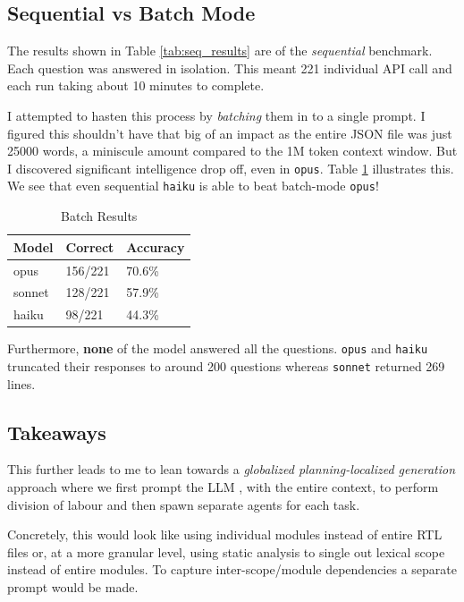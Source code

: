 \documentclass[letterpaper, 12pt]{article}
\begin{document}
\subsection{Sequential vs Batch Mode}
The results shown in Table \ref{tab:seq_results} are of the \textit{sequential}
benchmark. Each question was answered in isolation. This meant 221 individual
API call and each run taking about 10 minutes to complete.

I attempted to hasten this process by \textit{batching} them in to a
single prompt. I figured this shouldn't have that big of an impact as the entire
JSON file was just 25000 words, a miniscule amount compared to the 1M token
context window. But I discovered significant intelligence drop off, even in
\texttt{opus}. Table \ref{tab:batch_results} illustrates this. We see that
even sequential \texttt{haiku} is able to beat batch-mode \texttt{opus}!

\begin{table}[H]
	\centering
	\begin{tabular}{@{}lll@{}}
		\toprule
		Model  & Correct & Accuracy \\ \midrule
		opus   & 156/221 & 70.6\%   \\ \midrule
		sonnet & 128/221 & 57.9\%   \\ \midrule
		haiku  & 98/221  & 44.3\%   \\ \bottomrule
	\end{tabular}
	\caption{Batch Results}
	\label{tab:batch_results}
\end{table}

Furthermore, \textbf{none} of the model answered all the questions.
\texttt{opus} and \texttt{haiku} truncated their responses to around 200
questions whereas \texttt{sonnet} returned 269 lines.

\subsection{Takeaways}
This further leads to me to lean towards a \textit{globalized planning-localized
generation} approach where we first prompt the LLM , with the entire context, to
perform division of labour and then spawn separate agents for each task.

Concretely, this would look like using individual modules instead of entire
RTL files or, at a more granular level, using static analysis to single out
lexical scope instead of entire modules. To capture inter-scope/module
dependencies a separate prompt would be made.
\end{document}
